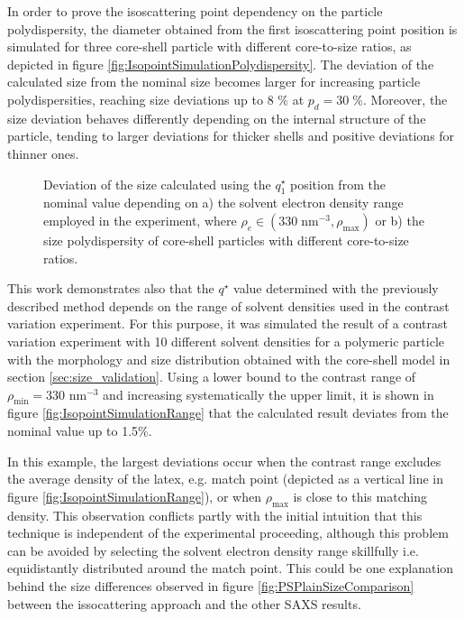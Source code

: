 In order to prove the isoscattering point dependency on the particle polydispersity, the diameter obtained from the first isoscattering point position is simulated for three core-shell particle with different core-to-size ratios, as depicted in figure \ref{fig:IsopointSimulationPolydispersity}. The deviation of the calculated size from the nominal size becomes larger for increasing particle polydispersities, reaching size deviations up to 8 $\%$ at $p_d = 30\;\%$. Moreover, the size deviation behaves differently depending on the internal structure of the particle, tending to larger deviations for thicker shells and positive deviations for thinner ones.

\begin{figure}%
	\centering
	\caption[Deviation of the size obtained with $q_1^{\star}$ from the nominal value.]{Deviation of the size calculated using the $q_1^{\star}$ position from the nominal value depending on a) the solvent electron density range employed in the experiment, where  $\rho_e \in (330\;\mbox{nm}^{-3}, \rho_{\text{max}})$ or b) the size polydispersity of core-shell particles with different core-to-size ratios.}

\end{figure}

This work demonstrates also that the $q^{\star}$ value determined with the previously described method depends on the range of solvent densities used in the contrast variation experiment. For this purpose, it was simulated the result of a contrast variation experiment with 10 different solvent densities for a polymeric particle with the morphology and size distribution obtained with the core-shell model in section \ref{sec:size_validation}. Using a lower bound to the contrast range of $\rho_{\text{min}}=330$ nm$^{-3}$ and increasing systematically the upper limit, it is shown in figure \ref{fig:IsopointSimulationRange} that the calculated result deviates from the nominal value up to 1.5$\%$. 

In this example, the largest deviations occur when the contrast range excludes the average density of the latex, e.g. match point (depicted as a vertical line in figure \ref{fig:IsopointSimulationRange}), or when $\rho_{\text{max}}$ is close to this matching density. This observation conflicts partly with the initial intuition that this technique is independent of the experimental proceeding, although this problem can be avoided by selecting the solvent electron density range skillfully i.e. equidistantly distributed around the match point. This could be one explanation behind the size differences observed in figure \ref{fig:PSPlainSizeComparison} between the issocattering approach and the other SAXS results.

